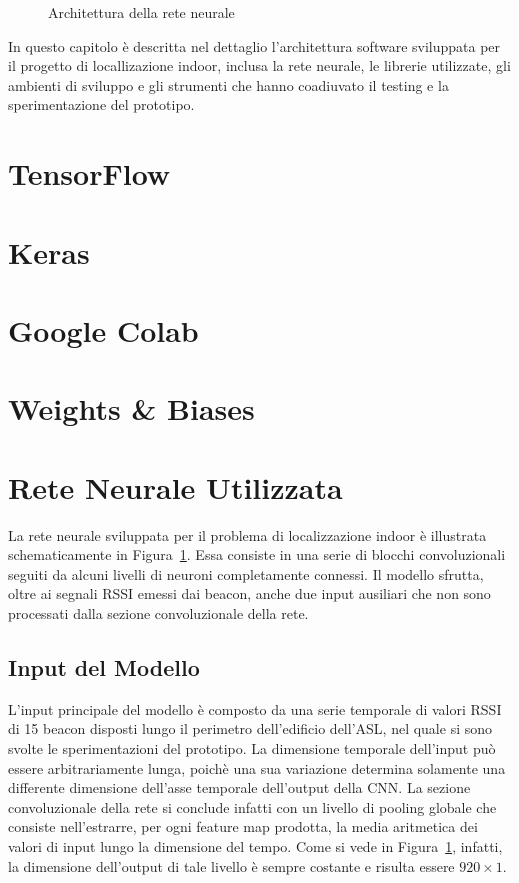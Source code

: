 
\begin{figure}[H]
  \caption{Architettura della rete neurale}%
  \label{fig:crynet}%
\end{figure}
In questo capitolo è descritta nel dettaglio l'architettura software sviluppata
per il progetto di locallizazione indoor, inclusa la rete neurale, le librerie
utilizzate, gli ambienti di sviluppo e gli strumenti che hanno coadiuvato il
testing e la sperimentazione del prototipo.
\section{TensorFlow}
\section{Keras}
\section{Google Colab}
\section{Weights \& Biases}
\section{Rete Neurale Utilizzata}
La rete neurale sviluppata per il problema di localizzazione indoor è
illustrata schematicamente in Figura~\ref{fig:crynet}. Essa consiste in una
serie di blocchi convoluzionali seguiti da alcuni livelli di neuroni
completamente connessi. Il modello sfrutta, oltre ai segnali RSSI emessi dai
beacon, anche due input ausiliari che non sono processati dalla sezione
convoluzionale della rete.
\subsection{Input del Modello}
L'input principale del modello è composto da una serie temporale di valori RSSI
di 15 beacon disposti lungo il perimetro dell'edificio dell'ASL, nel quale si
sono svolte le sperimentazioni del prototipo. La dimensione temporale
dell'input può essere arbitrariamente lunga, poichè una sua variazione
determina solamente una differente dimensione dell'asse temporale dell'output
della CNN\@. La sezione convoluzionale della rete si conclude infatti con un
livello di pooling globale che consiste nell'estrarre, per ogni feature map
prodotta, la media aritmetica dei valori di input lungo la dimensione del
tempo. Come si vede in Figura~\ref{fig:crynet}, infatti, la dimensione
dell'output di tale livello è sempre costante e risulta essere $920\times1$.

